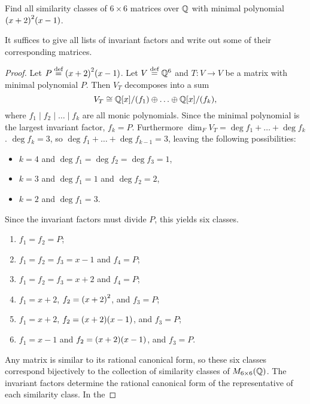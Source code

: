 \documentclass{./typewriter-math}
\begin{document}
	\begin{exercise}[(DF 12.2.10)]
		Find all similarity classes of \(6 \times 6\) matrices over \(\mathbb{Q}\) with
		minimal polynomial \({\left(x+2\right)}^2{\left(x-1\right)}\).

		\begin{warning_box*}
			It suffices to give all lists of invariant factors and write out some of
			their corresponding matrices.
		\end{warning_box*}

		\begin{proof}
			Let \(P \overset{\normalfont{\text{def}}}{=} {\left(x+2\right)}^2{\left(x-1\right)}\). Let \(V \overset{\normalfont{\text{def}}}{=} \mathbb{Q}^6\) and \(T:
			V \to V\) be a matrix with minimal polynomial \(P\). Then \(V_T\)
			decomposes into a sum%
			\[%
				V_T \cong \Q[x]/\pwrap{f_1} \oplus \ldots \oplus \Q[x]/\pwrap{f_k},
			\]%
			where \(f_1 \mid f_2 \mid \ldots \mid f_k\) are all monic polynomials.
			Since the minimal polynomial is the largest invariant factor, \(f_k = P\).
			Furthermore \(\dim_F V_T = \deg f_1 + \ldots + \deg f_k\). \(\deg f_k =
			3\), so \(\deg f_1 + \ldots + \deg f_{k-1} = 3\), leaving the following
			possibilities: \begin{itemize}%
				\item \(k = 4\) and \(\deg f_1 = \deg f_2 = \deg f_3 = 1\),
				\item \(k = 3\) and \(\deg f_1 = 1\) and \(\deg f_2 = 2\),
				\item \(k = 2\) and \(\deg f_1 = 3\).
			\end{itemize}%
			Since the invariant factors must divide \(P\), this yields six
			classes.\begin{enumerate}%
				\item \(f_1 = f_2 = P\);
				\item \(f_1 = f_2 = f_3 = x-1\) and \(f_4 = P\);
				\item \(f_1 = f_2 = f_3 = x+2\) and \(f_4 = P\);
				\item \(f_1 = x+2\), \(f_2 = {\left(x+2\right)}^2\), and \(f_3 = P\);
				\item \(f_1 = x+2\), \(f_2 = {\left(x+2\right)}{\left(x-1\right)}\), and \(f_3 = P\);
				\item \(f_1 = x-1\) and \(f_2 = {\left(x+2\right)}{\left(x-1\right)}\), and \(f_3 = P\).
			\end{enumerate}%
			Any matrix is similar to its rational canonical form, so these six classes
			correspond bijectively to the collection of similarity classes of
			\(M_{6\times 6}(\mathbb{Q})\). The invariant factors determine the rational
			canonical form of the representative of each similarity class. In the

\end{proof}
\end{exercise}
\end{document}
